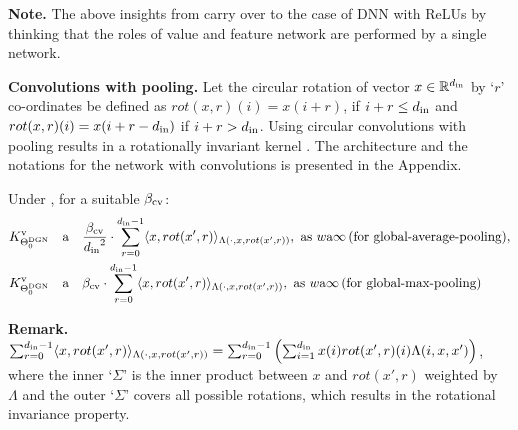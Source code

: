 \textbf{Note.} The above insights from  carry over to the case of DNN with ReLUs by thinking that the roles of value and feature network are performed by a single network.

\textbf{Convolutions with pooling.} Let the circular rotation of vector $x\in\mathbb{R}^{d_{\text{in}}}$ by `$r$' co-ordinates be defined as $rot(x,r)(i)=x(i+ r)$, if $i+r \leq d_{\text{in}}$ and $rot(x,r)(i)=x(i+ r-d_{\text{in}})$ if $i+r > d_{\text{in}}$. Using circular convolutions with pooling results in a rotationally invariant kernel . The architecture and the notations for the network with convolutions is presented in the Appendix.

\begin{theorem}\label{th:conv} Under , for  a suitable $\beta_{\text{cv}}$:
\begin{align*}
&K^{\text{v}}_{\Theta^{\text{DGN}}_0}&{\textnormal{a}}&\quad \frac{\beta_{\text{cv}}}{{d_{\text{in}}}^2} \cdot \sum_{r=0}^{d_{\text{in}}-1} \langle x,rot(x',r)\rangle_{\Lambda(\cdot, x,rot(x',r))},\,\, \text{as}\,\,  w{\textnormal{a}}\infty\,\text{(for global-average-pooling)}, \\
&K^{\text{v}}_{\Theta^{\text{DGN}}_0}&{\textnormal{a}}& \quad{\beta_{\text{cv}}} \cdot \sum_{r=0}^{d_{\text{in}}-1} \langle x,rot(x',r)\rangle_{\Lambda(\cdot, x,rot(x',r))},\,\, \text{as}\,\,  w{\textnormal{a}}\infty\,\text{(for global-max-pooling)}
\end{align*}
\end{theorem}
\textbf{Remark.} $\sum_{r=0}^{d_{\text{in}}-1} \langle x,rot(x',r)\rangle_{\Lambda(\cdot, x,rot(x',r))}=\sum_{r=0}^{d_{\text{in}}-1} \left(\sum_{i=1}^{d_{\text{in}}} x(i) rot(x',r)(i)\Lambda(i,x,x')\right)$, where the inner `$\Sigma$' is the inner product between $x$ and $rot(x',r)$ weighted by $\Lambda$ and the outer `$\Sigma$' covers all possible rotations, which results in the rotational invariance property.

